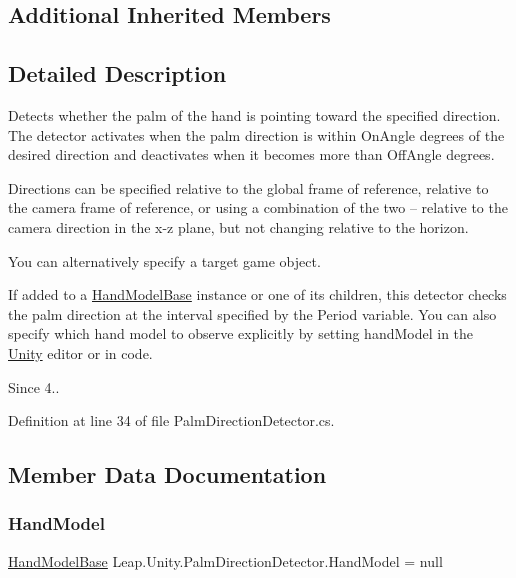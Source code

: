 \subsection*{Additional Inherited Members}


\subsection{Detailed Description}
Detects whether the palm of the hand is pointing toward the specified direction. The detector activates when the palm direction is within On\+Angle degrees of the desired direction and deactivates when it becomes more than Off\+Angle degrees.

Directions can be specified relative to the global frame of reference, relative to the camera frame of reference, or using a combination of the two -- relative to the camera direction in the x-\/z plane, but not changing relative to the horizon.

You can alternatively specify a target game object.

If added to a \mbox{\hyperlink{class_leap_1_1_unity_1_1_hand_model_base}{Hand\+Model\+Base}} instance or one of its children, this detector checks the palm direction at the interval specified by the Period variable. You can also specify which hand model to observe explicitly by setting hand\+Model in the \mbox{\hyperlink{namespace_leap_1_1_unity}{Unity}} editor or in code.

\begin{DoxySince}{Since}
4.. 
\end{DoxySince}


Definition at line 34 of file Palm\+Direction\+Detector.\+cs.



\subsection{Member Data Documentation}
\mbox{\label{class_leap_1_1_unity_1_1_palm_direction_detector_a04242cdc1ffec25e90d17617ab694926}} 
\subsubsection{\texorpdfstring{HandModel}{HandModel}}
{\footnotesize\ttfamily \mbox{\hyperlink{class_leap_1_1_unity_1_1_hand_model_base}{Hand\+Model\+Base}} Leap.\+Unity.\+Palm\+Direction\+Detector.\+Hand\+Model = null}

